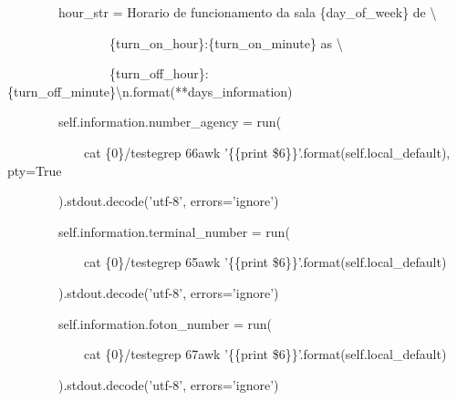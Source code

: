 {\ttfamily\color[rgb]{0.10980392,0.10980392,0.10980392}
    \ \ \ \ \ \ \ \ hour\_str = {\textquotedbl}Horario de funcionamento da sala \{day\_of\_week\} de {\textbackslash}}

{\ttfamily\color[rgb]{0.10980392,0.10980392,0.10980392}
    \ \ \ \ \ \ \ \ \ \ \ \ \ \ \ \ \{turn\_on\_hour\}:\{turn\_on\_minute\} as {\textbackslash}}

{\ttfamily\color[rgb]{0.10980392,0.10980392,0.10980392}
    \ \ \ \ \ \ \ \ \ \ \ \ \ \ \ \ \{turn\_off\_hour\}:\{turn\_off\_minute\}{\textbackslash}n{\textquotedbl}.format(**days\_information)}


    \bigskip

{\ttfamily\color[rgb]{0.10980392,0.10980392,0.10980392}
    \ \ \ \ \ \ \ \ self.information.number\_agency = run(}

            {\ttfamily\color[rgb]{0.10980392,0.10980392,0.10980392}
            \ \ \ \ \ \ \ \ \ \ \ \ {\textquotedbl}cat \{0\}/teste{\textbar}grep 66{\textbar}awk '\{\{print
            \$6\}\}'{\textquotedbl}.format(self.local\_default), pty=True}

            {\ttfamily\color[rgb]{0.10980392,0.10980392,0.10980392}
            \ \ \ \ \ \ \ \ ).stdout.decode('utf-8', errors='ignore')}


    \bigskip

{\ttfamily\color[rgb]{0.10980392,0.10980392,0.10980392}
    \ \ \ \ \ \ \ \ self.information.terminal\_number = run(}

            {\ttfamily\color[rgb]{0.10980392,0.10980392,0.10980392}
            \ \ \ \ \ \ \ \ \ \ \ \ {\textquotedbl}cat \{0\}/teste{\textbar}grep 65{\textbar}awk '\{\{print
            \$6\}\}'{\textquotedbl}.format(self.local\_default)}

            {\ttfamily\color[rgb]{0.10980392,0.10980392,0.10980392}
            \ \ \ \ \ \ \ \ ).stdout.decode('utf-8', errors='ignore')}


    \bigskip

{\ttfamily\color[rgb]{0.10980392,0.10980392,0.10980392}
    \ \ \ \ \ \ \ \ self.information.foton\_number = run(}

            {\ttfamily\color[rgb]{0.10980392,0.10980392,0.10980392}
            \ \ \ \ \ \ \ \ \ \ \ \ {\textquotedbl}cat \{0\}/teste{\textbar}grep 67{\textbar}awk '\{\{print
            \$6\}\}'{\textquotedbl}.format(self.local\_default)}

            {\ttfamily\color[rgb]{0.10980392,0.10980392,0.10980392}
            \ \ \ \ \ \ \ \ ).stdout.decode('utf-8', errors='ignore')}



